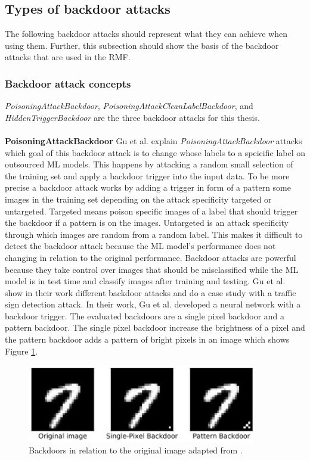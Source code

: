 \subsection{Types of backdoor attacks}
\label{sec:backdoor_types}

The following backdoor attacks should represent what they can achieve when using them. Further, this subsection should show the basis of the backdoor attacks that are used in the RMF.

\subsubsection*{Backdoor attack concepts}

\textit{PoisoningAttackBackdoor}, \textit{PoisoningAttackCleanLabelBackdoor}, and \textit{HiddenTriggerBackdoor} are the three backdoor attacks for this thesis. \\ \\
\textbf{PoisoningAttackBackdoor} Gu et al. \cite{DBLP:journals/corr/abs-1708-06733} explain \textit{PoisoningAttackBackdoor} attacks which goal of this backdoor attack is to change whose labels to a speicific label on outsourced ML models. This happens by attacking a random small selection of the training set and apply a backdoor trigger into the input data. To be more precise a backdoor attack works by adding a trigger in form of a pattern some images in the training set depending on the attack specificity targeted or untargeted. Targeted means poison specific images of a label that should trigger the backdoor if a pattern is on the images. Untargeted is an attack specificity through which images are random from a random label. This makes it difficult to detect the backdoor attack because the ML model's performance does not changing in relation to the original performance. Backdoor attacks are powerful because they take control over images that should be misclassified while the ML model is in test time \cite{turner2018clean} and classify images after training and testing. Gu et al. show in their work different backdoor attacks and do a case study with a traffic sign detection attack. In their work, Gu et al. developed a neural network with a backdoor trigger. The evaluated backdoors are a single pixel backdoor and a pattern backdoor. The single pixel backdoor increase the brightness of a pixel and the pattern backdoor adds a pattern of bright pixels in an image which shows Figure \ref{fig:backdoor_pattern}.

\begin{figure}[ht!]
  \centering
  \includegraphics[width=10cm]{pictures/backdoor_pattern_bad_net.jpg}
  \caption{Backdoors in relation to the original image adapted from \cite{DBLP:journals/corr/abs-1708-06733}.}
  \label{fig:backdoor_pattern}
\end{figure}

